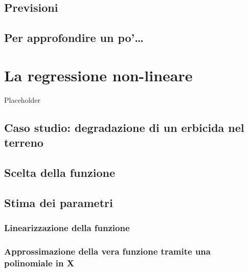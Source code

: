 \documentclass[a4paper,12pt,oneside]{book}
\begin{document}
\hypertarget{previsioni}{%
\section{Previsioni}\label{previsioni}}

\hypertarget{per-approfondire-un-po-4}{%
\section{Per approfondire un po'\ldots{}}\label{per-approfondire-un-po-4}}

\hypertarget{la-regressione-non-lineare}{%
\chapter{La regressione non-lineare}\label{la-regressione-non-lineare}}

Placeholder

\hypertarget{caso-studio-degradazione-di-un-erbicida-nel-terreno}{%
\section{Caso studio: degradazione di un erbicida nel terreno}\label{caso-studio-degradazione-di-un-erbicida-nel-terreno}}

\hypertarget{scelta-della-funzione}{%
\section{Scelta della funzione}\label{scelta-della-funzione}}

\hypertarget{stima-dei-parametri-4}{%
\section{Stima dei parametri}\label{stima-dei-parametri-4}}

\hypertarget{linearizzazione-della-funzione}{%
\subsection{Linearizzazione della funzione}\label{linearizzazione-della-funzione}}

\hypertarget{approssimazione-della-vera-funzione-tramite-una-polinomiale-in-x}{%
\subsection{Approssimazione della vera funzione tramite una polinomiale in X}\label{approssimazione-della-vera-funzione-tramite-una-polinomiale-in-x}}
\end{document}
